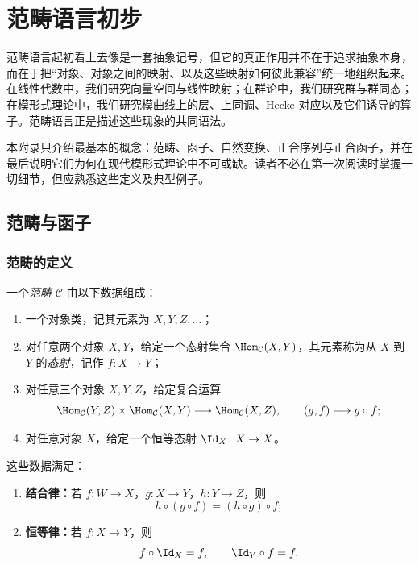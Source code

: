 \chapter{范畴语言初步}

范畴语言起初看上去像是一套抽象记号，但它的真正作用并不在于追求抽象本身，而在于把“对象、对象之间的映射、以及这些映射如何彼此兼容”统一地组织起来。在线性代数中，我们研究向量空间与线性映射；在群论中，我们研究群与群同态；在模形式理论中，我们研究模曲线上的层、上同调、Hecke 对应以及它们诱导的算子。范畴语言正是描述这些现象的共同语法。

本附录只介绍最基本的概念：范畴、函子、自然变换、正合序列与正合函子，并在最后说明它们为何在现代模形式理论中不可或缺。读者不必在第一次阅读时掌握一切细节，但应熟悉这些定义及典型例子。

\section{范畴与函子}

\subsection{范畴的定义}

\begin{definition}
一个\emph{范畴} $\mathcal C$ 由以下数据组成：
\begin{enumerate}[label=(\arabic*), leftmargin=2.5em]
  \item 一个对象类，记其元素为 $X,Y,Z,\dots$；
  \item 对任意两个对象 $X,Y$，给定一个态射集合 $\Hom_{\mathcal C}(X,Y)$，其元素称为从 $X$ 到 $Y$ 的\emph{态射}，记作 $f\colon X\to Y$；
  \item 对任意三个对象 $X,Y,Z$，给定复合运算
  \[
    \Hom_{\mathcal C}(Y,Z)\times \Hom_{\mathcal C}(X,Y)\longrightarrow \Hom_{\mathcal C}(X,Z),
    \qquad (g,f)\longmapsto g\circ f;
  \]
  \item 对任意对象 $X$，给定一个恒等态射 $\Id_X\colon X\to X$。
\end{enumerate}
这些数据满足：
\begin{enumerate}[label=(\roman*), leftmargin=2.5em]
  \item \textbf{结合律：}若 $f\colon W\to X$，$g\colon X\to Y$，$h\colon Y\to Z$，则
  \[
    h\circ (g\circ f)=(h\circ g)\circ f;
  \]
  \item \textbf{恒等律：}若 $f\colon X\to Y$，则
  \[
    f\circ \Id_X=f,
    \qquad
    \Id_Y\circ f=f.
  \]
\end{enumerate}
\end{definition}

